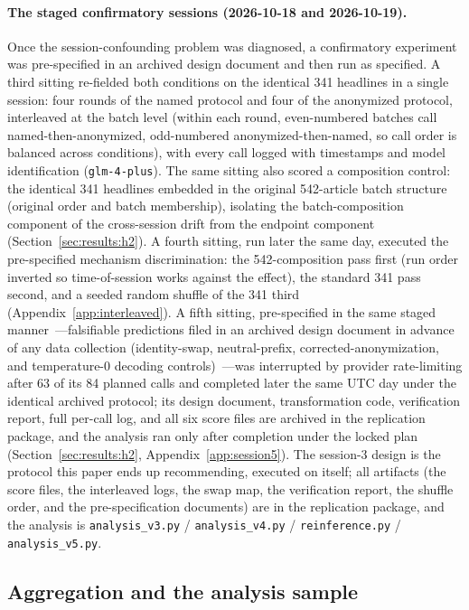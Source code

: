 \paragraph{The staged confirmatory sessions (2026-10-18 and 2026-10-19).} Once the session-confounding problem was diagnosed, a confirmatory experiment was pre-specified in an archived design document and then run as specified. A third sitting re-fielded both conditions on the identical 341 headlines in a single session: four rounds of the named protocol and four of the anonymized protocol, interleaved at the batch level (within each round, even-numbered batches call named-then-anonymized, odd-numbered anonymized-then-named, so call order is balanced across conditions), with every call logged with timestamps and model identification (\texttt{glm-4-plus}). The same sitting also scored a composition control: the identical 341 headlines embedded in the original 542-article batch structure (original order and batch membership), isolating the batch-composition component of the cross-session drift from the endpoint component (Section~\ref{sec:results:h2}). A fourth sitting, run later the same day, executed the pre-specified mechanism discrimination: the 542-composition pass first (run order inverted so time-of-session works against the effect), the standard 341 pass second, and a seeded random shuffle of the 341 third (Appendix~\ref{app:interleaved}). A fifth sitting, pre-specified in the same staged manner~---falsifiable predictions filed in an archived design document in advance of any data collection (identity-swap, neutral-prefix, corrected-anonymization, and temperature-0 decoding controls)~---was interrupted by provider rate-limiting after 63 of its 84 planned calls and completed later the same UTC day under the identical archived protocol; its design document, transformation code, verification report, full per-call log, and all six score files are archived in the replication package, and the analysis ran only after completion under the locked plan (Section~\ref{sec:results:h2}, Appendix~\ref{app:session5}). The session-3 design is the protocol this paper ends up recommending, executed on itself; all artifacts (the score files, the interleaved logs, the swap map, the verification report, the shuffle order, and the pre-specification documents) are in the replication package, and the analysis is \texttt{analysis\_v3.py} / \texttt{analysis\_v4.py} / \texttt{reinference.py} / \texttt{analysis\_v5.py}.

\subsection{Aggregation and the analysis sample}

